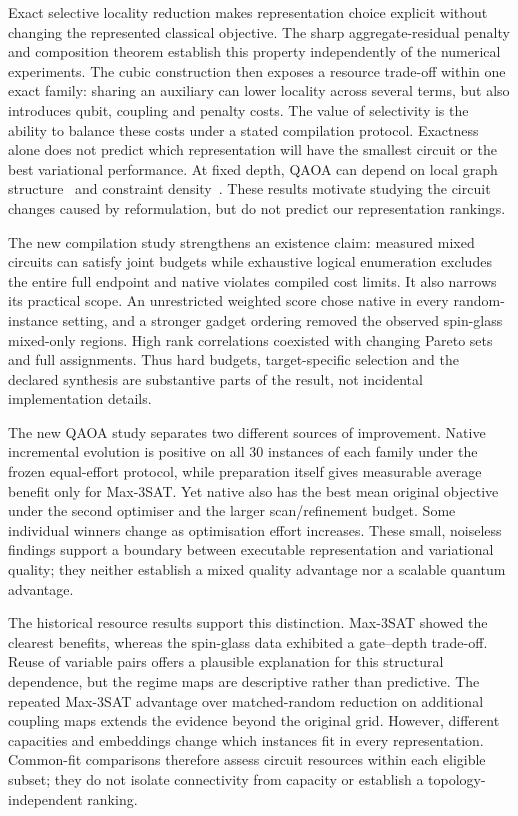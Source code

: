 \documentclass[a4paper,onecolumn,11pt,unpublished]{quantumarticle}
\theoremstyle{remark}
\begin{document}
Exact selective locality reduction makes representation choice explicit
without changing the represented classical objective. The sharp
aggregate-residual penalty and composition theorem establish this property
independently of the numerical experiments. The cubic construction then
exposes a resource trade-off within one exact family: sharing an auxiliary
can lower locality across several terms, but also introduces qubit, coupling
and penalty costs. The value of selectivity is the ability to balance these
costs under a stated compilation protocol. Exactness alone does not predict
which representation will have the smallest circuit or the best variational
performance. At fixed depth, QAOA can depend on local graph
structure~\cite{WangMaxCut2018,FarhiLocal2020} and constraint
density~\cite{Akshay2020}. These results motivate studying the circuit
changes caused by reformulation, but do not predict our representation
rankings.

The new compilation study strengthens an existence claim: measured mixed circuits can satisfy joint budgets while exhaustive logical enumeration excludes the entire full endpoint and native violates compiled cost limits. It also narrows its practical scope. An unrestricted weighted score chose native in every random-instance setting, and a stronger gadget ordering removed the observed spin-glass mixed-only regions. High rank correlations coexisted with changing Pareto sets and full assignments. Thus hard budgets, target-specific selection and the declared synthesis are substantive parts of the result, not incidental implementation details.

The new QAOA study separates two different sources of improvement. Native incremental evolution is positive on all 30 instances of each family under the frozen equal-effort protocol, while preparation itself gives measurable average benefit only for Max-3SAT. Yet native also has the best mean original objective under the second optimiser and the larger scan/refinement budget. Some individual winners change as optimisation effort increases. These small, noiseless findings support a boundary between executable representation and variational quality; they neither establish a mixed quality advantage nor a scalable quantum advantage.

The historical resource results support this distinction. Max-3SAT showed the clearest
benefits, whereas the spin-glass data exhibited a gate--depth trade-off.
Reuse of variable pairs offers a plausible explanation for this structural
dependence, but the regime maps are descriptive rather than predictive.
The repeated Max-3SAT advantage over matched-random reduction on additional
coupling maps extends the evidence beyond the original grid. However,
different capacities and embeddings change which instances fit in every
representation. Common-fit comparisons therefore assess circuit resources
within each eligible subset; they do not isolate connectivity from capacity
or establish a topology-independent ranking.
\end{document}
